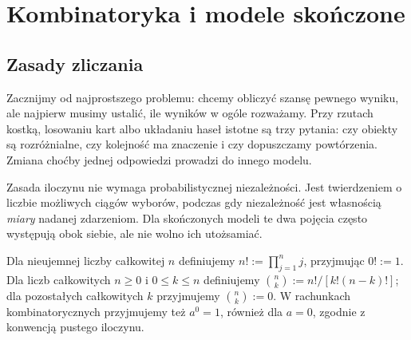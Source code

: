 \chapter{Kombinatoryka i modele skończone}
\label{ch:combinatorics}

\section{Zasady zliczania}
Zacznijmy od najprostszego problemu: chcemy obliczyć szansę
pewnego wyniku, ale najpierw musimy ustalić, ile wyników w ogóle
rozważamy. Przy rzutach kostką, losowaniu kart albo układaniu haseł
istotne są trzy pytania: czy obiekty są rozróżnialne, czy kolejność
ma znaczenie i czy dopuszczamy powtórzenia. Zmiana choćby jednej
odpowiedzi prowadzi do innego modelu.

Zasada iloczynu nie wymaga probabilistycznej niezależności.
Jest twierdzeniem o liczbie możliwych ciągów wyborów, podczas gdy
niezależność jest własnością \emph{miary} nadanej zdarzeniom.
Dla skończonych modeli te dwa pojęcia często występują obok siebie,
ale nie wolno ich utożsamiać.

\begin{definicja}
Dla nieujemnej liczby całkowitej $n$ definiujemy $n!:=\prod_{j=1}^n j$, przyjmując $0!:=1$.
Dla liczb całkowitych $n\geq0$ i $0\leq k\leq n$ definiujemy
$\binom nk:=n!/[k!(n-k)!]$; dla pozostałych całkowitych $k$ przyjmujemy
$\binom nk:=0$. W rachunkach kombinatorycznych przyjmujemy też
$a^0=1$, również dla $a=0$, zgodnie z konwencją pustego iloczynu.
\end{definicja}

